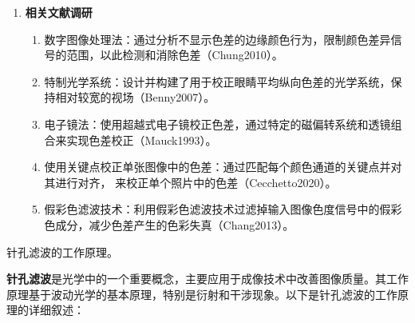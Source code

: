 \documentclass[dvipsnames, svgnames,a4paper,11pt]{article}
\begin{document}
\begin{enumerate}
		\item \textbf{相关文献调研}
		\begin{enumerate}
			\item 数字图像处理法：通过分析不显示色差的边缘颜色行为，限制颜色差异信号的范围，以此检测和消除色差（Chung2010）。
			
			\item 特制光学系统：设计并构建了用于校正眼睛平均纵向色差的光学系统，保持相对较宽的视场（Benny2007）。
			
			\item 电子镜法：使用超越式电子镜校正色差，通过特定的磁偏转系统和透镜组合来实现色差校正（Mauck1993）。
			
			\item 使用关键点校正单张图像中的色差：通过匹配每个颜色通道的关键点并对其进行对齐，
			来校正单个照片中的色差（Cecchetto2020）。
			
			\item 假彩色滤波技术：利用假彩色滤波技术过滤掉输入图像色度信号中的假彩色成分，减少色差产生的色彩失真（Chang2013）。
		\end{enumerate}
	\end{enumerate}
	
	\begin{question}
		针孔滤波的工作原理。
	\end{question}
	\textbf{针孔滤波}是光学中的一个重要概念，主要应用于成像技术中改善图像质量。其工作原理基于波动光学的基本原理，特别是衍射和干涉现象。以下是针孔滤波的工作原理的详细叙述：
	
\end{document}
